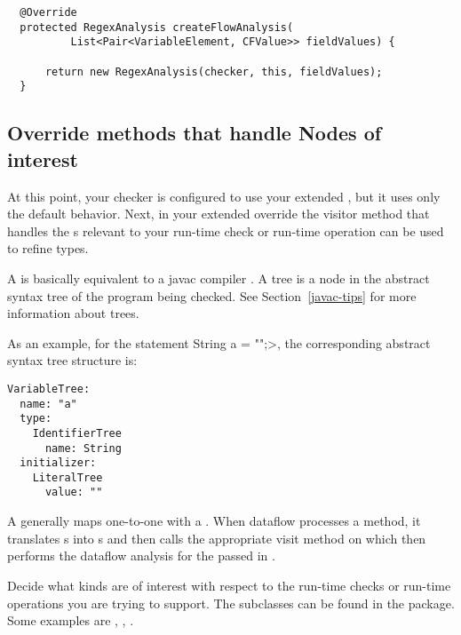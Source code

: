 \begin{enumerate}
\begin{smaller}
\begin{Verbatim}
  @Override
  protected RegexAnalysis createFlowAnalysis(
          List<Pair<VariableElement, CFValue>> fieldValues) {

      return new RegexAnalysis(checker, this, fieldValues);
  }
\end{Verbatim}
\end{smaller}

\end{enumerate}

\subsection{Override methods that handle Nodes of interest\label{dataflow-override-methods}}

At this point, your checker is configured to use your extended
, but it uses only the default
behavior. Next, in your extended 
override the visitor method that handles the s
relevant to your run-time check or run-time operation can be used to refine
types.

A  is basically equivalent to a javac compiler
.  A tree is a node in the abstract syntax tree of the
program being checked. See Section~\ref{javac-tips} for more information about trees.

As an example, for the statement \<String a = "";>, the corresponding
abstract syntax tree structure is:
\begin{Verbatim}
VariableTree:
  name: "a"
  type:
    IdentifierTree
      name: String
  initializer:
    LiteralTree
      value: ""
\end{Verbatim}

A  generally maps one-to-one with a
. When dataflow processes a method, it translates
s into s and then
calls the appropriate visit method on
 which then performs the dataflow
analysis for the passed in .

Decide what  kinds are of interest with
respect to the run-time checks or run-time operations you are trying to support.
The  subclasses can be found in the
 package.  Some examples are
,
,
.

